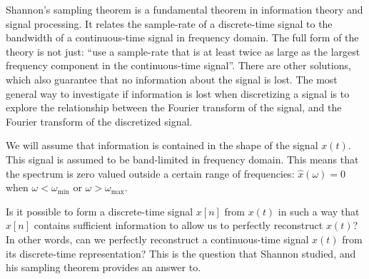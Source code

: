 Shannon's sampling theorem is a fundamental theorem in information theory and signal processing. It relates the sample-rate of a discrete-time signal to the bandwidth of a continuous-time signal in frequency domain. 
The full form of the theory is not just: ``use a sample-rate that is at least twice as large as the largest frequency component in the continuous-time signal''. There are other solutions, which also guarantee that no information about the signal is lost. 
The most general way to investigate if information is lost when discretizing a signal is to explore the relationship between the Fourier transform of the signal, and the Fourier transform of the discretized signal.

We will assume that information is contained in the shape of the signal $x(t)$. This signal is assumed to be band-limited in frequency domain. 
This means that the spectrum is zero valued outside a certain range of frequencies: $\hat{x}(\omega) = 0$ when $\omega < \omega_{\mathrm{min}}$ or $\omega > \omega_{\mathrm{max}}$.

Is it possible to form a discrete-time signal $x[n]$ from $x(t)$ in such a way that $x[n]$ contains sufficient information to 
allow us to perfectly reconstruct $x(t)$? In other words, can we perfectly reconstruct a continuous-time signal $x(t)$ from 
its discrete-time representation? This is the question that Shannon studied, and his sampling theorem provides an answer to.

